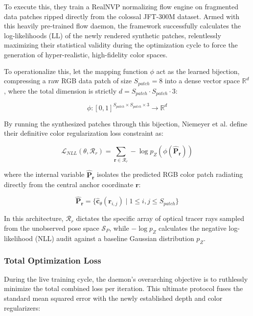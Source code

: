 To execute this, they train a RealNVP normalizing flow engine on fragmented data patches ripped directly from the colossal JFT-300M dataset. Armed with this heavily pre-trained flow daemon, the framework successfully calculates the log-likelihoods (LL) of the newly rendered synthetic patches, relentlessly maximizing their statistical validity during the optimization cycle to force the generation of hyper-realistic, high-fidelity color spaces.

To operationalize this, let the mapping function $\phi$ act as the learned bijection, compressing a raw RGB data patch of size $S_{patch} = 8$ into a dense vector space $\mathbb{R}^d$, where the total dimension is strictly $d = S_{patch} \cdot S_{patch} \cdot 3$:

\begin{equation}
\phi : [0,1]^{S_{patch} \times S_{patch} \times 3} \rightarrow \mathbb{R}^d
\end{equation}

By running the synthesized patches through this bijection, Niemeyer et al. define their definitive color regularization loss constraint as:

\begin{equation}
\mathcal{L}_{NLL}(\theta, \mathcal{R}_r) = \sum_{\mathbf{r} \in \mathcal{R}_r} -\log p_Z \left( \phi(\hat{\mathbf{P}}_{\mathbf{r}}) \right)
\end{equation}

where the internal variable $\hat{\mathbf{P}}_{\mathbf{r}}$ isolates the predicted RGB color patch radiating directly from the central anchor coordinate $\mathbf{r}$:

\begin{equation}
\hat{\mathbf{P}}_{\mathbf{r}} = \{ \hat{\mathbf{c}}_\theta(\mathbf{r}_{i,j}) \mid 1 \le i,j \le S_{patch} \}
\end{equation}

In this architecture, $\mathcal{R}_r$ dictates the specific array of optical tracer rays sampled from the unobserved pose space $\mathcal{S}_P$, while $-\log p_Z$ calculates the negative log-likelihood (NLL) audit against a baseline Gaussian distribution $p_Z$.

\subsubsection{Total Optimization Loss}
During the live training cycle, the daemon's overarching objective is to ruthlessly minimize the total combined loss per iteration. This ultimate protocol fuses the standard mean squared error with the newly established depth and color regularizers:

